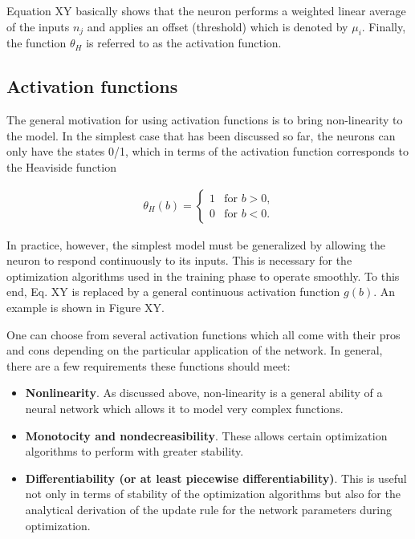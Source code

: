 Equation XY basically shows that the neuron performs a weighted linear average of the inputs $ n_j $ and applies an offset (threshold) which is denoted by $ \mu_i $. Finally, the function $ \theta_H $ is referred to as the activation function.

\subsection{Activation functions}

The general motivation for using activation functions is to bring non-linearity to the model. In the simplest case that has been discussed so far, the neurons can only have the states 0/1, which in terms of the activation function corresponds to the Heaviside function

\begin{gather}
	\theta_H(b) = 
	\begin{cases}	
	1 & \text{for $b > 0$,}\\
	0 & \text{for $b < 0$.}
	\end{cases} 
\end{gather}

In practice, however, the simplest model must be generalized by allowing the neuron to respond continuously to its inputs. This is necessary for the optimization algorithms used in the training phase to operate smoothly. To this end, Eq. XY is replaced by a general continuous activation function $ g(b) $. An example is shown in Figure XY.

One can choose from several activation functions which all come with their pros and cons depending on the particular application of the network. In general, there are a few requirements these functions should meet:

\begin{itemize}
	
\item \textbf{Nonlinearity}. As discussed above, non-linearity is a general ability of a neural network which allows it to model very complex functions.
\item \textbf{Monotocity and nondecreasibility}. These allows certain optimization algorithms to perform with greater stability.
\item \textbf{Differentiability (or at least piecewise differentiability)}. This is useful not only in terms of stability of the optimization algorithms but also for the analytical derivation of the update rule for the network parameters during optimization. 
		
\end{itemize}

